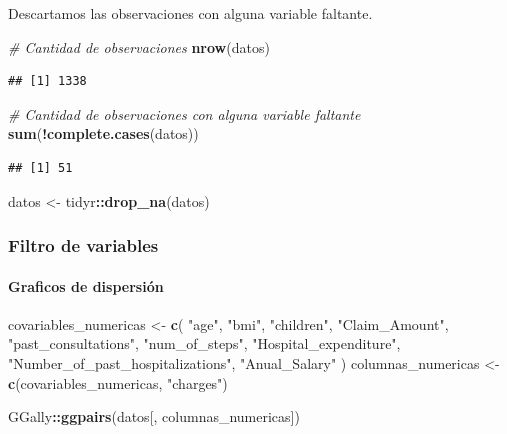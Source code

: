 \documentclass[
]{article}
\newenvironment{Shaded}{\begin{snugshade}}{\end{snugshade}}
\newcommand{\CommentTok}[1]{\textcolor[rgb]{0.56,0.35,0.01}{\textit{#1}}}
\newcommand{\FunctionTok}[1]{\textcolor[rgb]{0.13,0.29,0.53}{\textbf{#1}}}
\newcommand{\NormalTok}[1]{#1}
\newcommand{\OtherTok}[1]{\textcolor[rgb]{0.56,0.35,0.01}{#1}}
\newcommand{\SpecialCharTok}[1]{\textcolor[rgb]{0.81,0.36,0.00}{\textbf{#1}}}
\newcommand{\StringTok}[1]{\textcolor[rgb]{0.31,0.60,0.02}{#1}}
\begin{document}
Descartamos las observaciones con alguna variable faltante.

\begin{Shaded}
\begin{Highlighting}[]
\CommentTok{\# Cantidad de observaciones}
\FunctionTok{nrow}\NormalTok{(datos)}
\end{Highlighting}
\end{Shaded}

\begin{verbatim}
## [1] 1338
\end{verbatim}

\begin{Shaded}
\begin{Highlighting}[]
\CommentTok{\# Cantidad de observaciones con alguna variable faltante}
\FunctionTok{sum}\NormalTok{(}\SpecialCharTok{!}\FunctionTok{complete.cases}\NormalTok{(datos))}
\end{Highlighting}
\end{Shaded}

\begin{verbatim}
## [1] 51
\end{verbatim}

\begin{Shaded}
\begin{Highlighting}[]
\NormalTok{datos }\OtherTok{\textless{}{-}}\NormalTok{ tidyr}\SpecialCharTok{::}\FunctionTok{drop\_na}\NormalTok{(datos)}
\end{Highlighting}
\end{Shaded}

\subsubsection{Filtro de variables}\label{filtro-de-variables}

\paragraph{Graficos de dispersión}\label{graficos-de-dispersiuxf3n}

\begin{Shaded}
\begin{Highlighting}[]
\NormalTok{covariables\_numericas }\OtherTok{\textless{}{-}} \FunctionTok{c}\NormalTok{(}
  \StringTok{"age"}\NormalTok{,}
  \StringTok{"bmi"}\NormalTok{,}
  \StringTok{"children"}\NormalTok{,}
  \StringTok{"Claim\_Amount"}\NormalTok{,}
  \StringTok{"past\_consultations"}\NormalTok{,}
  \StringTok{"num\_of\_steps"}\NormalTok{,}
  \StringTok{"Hospital\_expenditure"}\NormalTok{,}
  \StringTok{"Number\_of\_past\_hospitalizations"}\NormalTok{,}
  \StringTok{"Anual\_Salary"}
\NormalTok{)}
\NormalTok{columnas\_numericas }\OtherTok{\textless{}{-}} \FunctionTok{c}\NormalTok{(covariables\_numericas, }\StringTok{"charges"}\NormalTok{)}

\NormalTok{GGally}\SpecialCharTok{::}\FunctionTok{ggpairs}\NormalTok{(datos[, columnas\_numericas])}
\end{Highlighting}
\end{Shaded}
\end{document}
